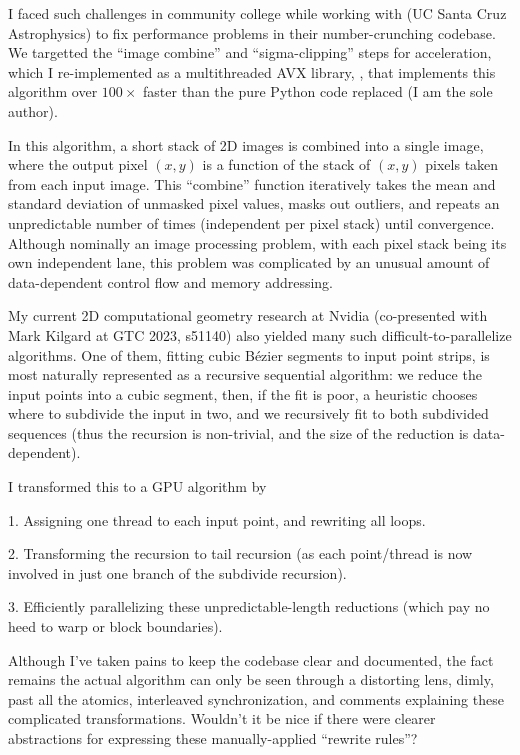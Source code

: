 I faced such challenges in community college while working with  (UC Santa Cruz Astrophysics) to fix performance problems in their number-crunching codebase. We targetted the ``image combine'' and ``sigma-clipping'' steps for acceleration, which I re-implemented as a multithreaded AVX library, , that implements this algorithm over $100\times$ faster than the pure Python code replaced (I am the sole author).

In this algorithm, a short stack of 2D images is combined into a single image, where the output pixel $(x,y)$ is a function of the stack of $(x,y)$ pixels taken from each input image.  This ``combine'' function iteratively takes the mean and standard deviation of unmasked pixel values, masks out outliers, and repeats an unpredictable number of times (independent per pixel stack) until convergence. Although nominally an image processing problem, with each pixel stack being its own independent lane, this problem was
complicated by an unusual amount of data-dependent control flow and memory addressing.

My current 2D computational geometry research at Nvidia (co-presented with Mark Kilgard at GTC 2023, s51140) also yielded many such difficult-to-parallelize algorithms. One of them, fitting cubic Bézier segments to input point strips, is most naturally represented as a recursive sequential algorithm: we reduce the input points into a cubic segment, then, if the fit is poor, a heuristic chooses where to subdivide the input in two, and we recursively fit to both subdivided sequences (thus the recursion is non-trivial, and the size of the reduction is data-dependent).

I transformed this to a GPU algorithm by

1. Assigning one thread to each input point, and rewriting all loops.

2. Transforming the recursion to tail recursion (as each point/thread is now involved in just one branch of the subdivide recursion).

3. Efficiently parallelizing these unpredictable-length reductions (which pay no heed to warp or block boundaries).

Although I've taken pains to keep the codebase clear and documented, the fact remains the actual algorithm can only be seen through a distorting lens, dimly, past all the atomics, interleaved synchronization, and comments explaining these complicated transformations. Wouldn't it be nice if there were clearer abstractions for expressing these manually-applied ``rewrite rules''?

